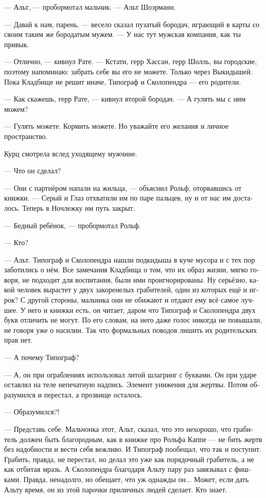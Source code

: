 \documentclass[a4paper,12pt,fleqn]{book}\usepackage{polyglossia}\setdefaultlanguage[babelshorthands=true]{russian}\setotherlanguage{english}\defaultfontfeatures{Ligatures=TeX,Mapping=tex-text}\usepackage{xcolor}\newcommand{\ml}[3]{#2}
\begin{document}
--- Альт, --- пробормотал мальчик.
\ml{$0$}
{--- Альт Шоэрманн.}
{``Alt Scheuermann.''}

--- Давай к нам, парень, --- весело сказал пузатый бородач, играющий в карты со своим таким же бородатым мужем.
--- У нас тут мужская компания, как ты привык.

--- Отлично, --- кивнул Рате.
--- Кстати, герр Хассан, герр Шолль, вы городские, поэтому напоминаю: забрать себе вы его не можете.
Только через Выкидышей.
Пока Кладбище не решит иначе, Типограф и Сколопендра --- его родители.

--- Как скажешь, герр Рате, --- кивнул второй бородач.
--- А гулять мы с ним можем?

--- Гулять можете.
Кормить можете.
Но уважайте его желания и личное пространство.

Курц смотрела вслед уходящему мужчине.

--- Что он сделал?

--- Они с партнёром напали на жильца, --- объяснил Рольф, оторвавшись от книжки.
--- Серый и Глаз отхватили им по паре пальцев, ну и от нас им досталось.
Теперь в Ночлежку им путь закрыт.

--- Бедный ребёнок, --- пробормотал Рольф.

--- Кто?

--- Альт.
Типограф и Сколопендра нашли подкидыша в куче мусора и с тех пор заботились о нём.
Все замечания Кладбища о том, что их образ жизни, мягко говоря, не подходит для воспитания, были ими проигнорированы.
Ну серьёзно, какой человек вырастет у двух закоренелых грабителей, один из которых ещё и игрок?
С другой стороны, мальчика они не обижают и отдают ему всё самое лучшее.
У него и книжки есть, он читает, даром что Типограф и Сколопендра двух букв отличить не могут.
По его словам, на него даже голос никогда не повышали, не говоря уже о насилии.
Так что формальных поводов лишить их родительских прав нет.

\ml{$0$}
{--- А почему Типограф?}
{``Why Printer?''}

--- А, он при ограблениях использовал литой шлагринг с буквами.
Он при ударе оставлял на теле непечатную надпись.
Элемент унижения для жертвы.
Потом образумился и перестал, а прозвище осталось.

--- Образумился?!

--- Представь себе.
Мальчонка этот, Альт, сказал, что это нехорошо, что грабитель должен быть благородным, как в книжке про Рольфа Каппе --- не бить жертв без надобности и вести себя вежливо.
И Типограф пообещал, что так и поступит.
Грабить, правда, не перестал, но делал это уже как порядочный грабитель, а не как отбитая мразь.
А Сколопендра благодаря Альту пару раз завязывал с фишками.
Правда, ненадолго, но обещает, что уж однажды он...
Может, если дать Альту время, он из этой парочки приличных людей сделает.
Кто знает.
\end{document}
